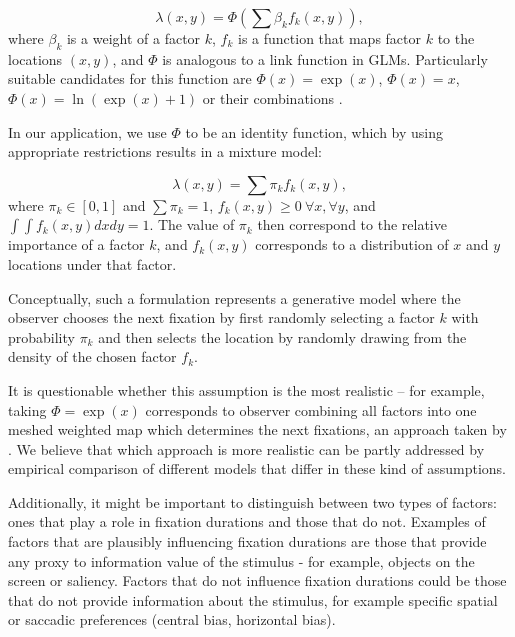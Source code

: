 \documentclass{article}
\begin{document}
\begin{equation}
    \lambda(x, y) = \Phi \left(\sum \beta_k f_k(x, y) \right),
\end{equation}
where $\beta_k$ is a weight of a factor $k$, $f_k$ is a function that maps factor $k$ to the locations $(x, y)$, and $\Phi$ is analogous to a link function in GLMs. Particularly suitable candidates for this function are $\Phi (x) = \exp(x)$, $\Phi (x) = x$, $\Phi (x) = \ln(\exp(x) + 1)$ or their combinations \citep[see ][for the discussion of the differences between them]{barthelme2013spatial}. 

In our application, we use $\Phi$ to be an identity function, which by using appropriate restrictions results in a mixture model:

\begin{equation}
\label{eq:lambdaMixture}
    \lambda(x, y) = \sum \pi_k f_k(x, y),
\end{equation}
where $\pi_k \in [0, 1]$ and $\sum \pi_k = 1$, $f_k(x, y) \geq 0~\forall x, \forall y$, and $\int \int f_k(x, y) dx dy = 1$. The value of $\pi_k$ then correspond to the relative importance of a factor $k$, and $f_k(x, y)$ corresponds to a distribution of $x$ and $y$ locations under that factor.

Conceptually, such a formulation represents a generative model where the observer chooses the next fixation by first randomly selecting a factor $k$ with probability $\pi_k$ and then selects the location by randomly drawing from the density of the chosen factor $f_k$.

It is questionable whether this assumption is the most realistic -- for example, taking $\Phi = \exp(x)$ corresponds to observer combining all factors into one meshed weighted map which determines the next fixations, an approach taken by \citet{barthelme2013spatial}. We believe that which approach is more realistic can be partly addressed by empirical comparison of different models that differ in these kind of assumptions.

Additionally, it might be important to distinguish between two types of factors: ones that play a role in fixation durations and those that do not. Examples of factors that are plausibly influencing fixation durations are those that provide any proxy to information value of the stimulus - for example, objects on the screen or saliency. Factors that do not influence fixation durations could be those that do not provide information about the stimulus, for example specific spatial or saccadic preferences (central bias, horizontal bias).
\end{document}
